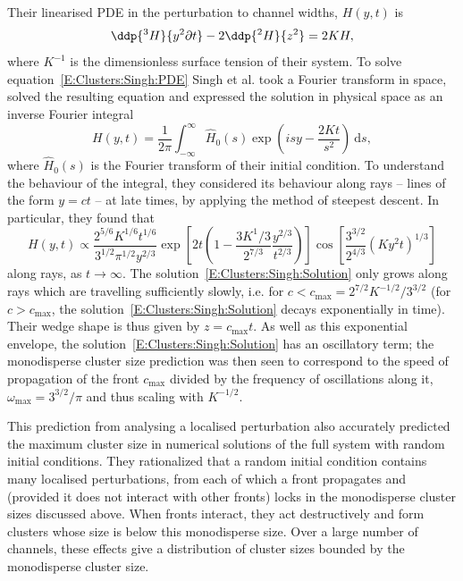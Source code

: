 Their linearised PDE in the perturbation to channel widths, $H(y,t)$ is
\begin{equation}\label{E:Clusters:Singh:PDE}
\ddp{^3 H}{y^2 \partial t} - 2\ddp{^2 H}{z^2} = 2K H,
\end{equation}
where $K^{-1}$ is the dimensionless surface tension of their system. To solve equation~\eqref{E:Clusters:Singh:PDE} Singh et al. took a Fourier transform in space, solved the resulting equation and expressed the solution in physical space as an inverse Fourier integral
\begin{equation}
H(y,t) = \frac{1}{2\pi}\int_{-\infty}^{\infty} \hat{H}_0(s)\exp\left(isy - \frac{2Kt}{s^2}\right)~\mathrm{d}s,
\end{equation}
where $\hat{H}_0(s)$ is the Fourier transform of their initial condition. To understand the behaviour of the integral, they considered its behaviour along rays -- lines of the form $y = ct$ -- at late times, by applying the method of steepest descent. In particular, they found that
\begin{equation}\label{E:Clusters:Singh:Solution}
H(y,t) \propto \frac{2^{5/6}K^{1/6}t^{1/6}}{3^{1/2}\pi^{1/2}y^{2/3}}\exp\left[2t\left(1 - \frac{3K^1/3}{2^{7/3}}\frac{y^{2/3}}{t^{2/3}}\right)\right]\cos \left[ \frac{3^{3/2}}{2^{4/3}}(Ky^2 t)^{1/3}\right]
\end{equation}
along rays, as $t \to \infty$. The solution~\eqref{E:Clusters:Singh:Solution} only grows along rays which are travelling sufficiently slowly, i.e. for $c < c_{\max} = 2^{7/2}K^{-1/2}/3^{3/2}$ (for $c > c_{\max}$, the solution~\eqref{E:Clusters:Singh:Solution} decays exponentially in time). Their wedge shape is thus given by $z = c_{\max} t$. As well as this exponential envelope, the solution~\eqref{E:Clusters:Singh:Solution} has an oscillatory term; the monodisperse cluster size prediction was then seen to correspond to the speed of propagation of the front $c_{\max}$ divided by the frequency of oscillations along it, $\omega_{\max} = 3^{3/2}/\pi$ and thus scaling with $K^{-1/2}$.

This prediction from analysing a localised perturbation also accurately predicted the maximum cluster size in numerical solutions of the full system with random initial conditions. They rationalized that a random initial condition contains many localised perturbations, from each of which a front propagates and (provided it does not interact with other fronts) locks in the monodisperse cluster sizes discussed above. When fronts interact, they act destructively and form clusters whose size is below this monodisperse size. Over a large number of channels, these effects give a distribution of cluster sizes bounded by the monodisperse cluster size.

